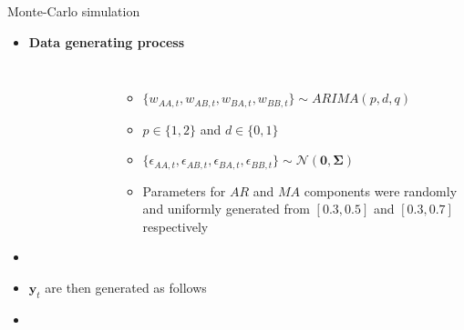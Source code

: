 \documentclass[11pt,xcolor=dvipsnames,table]{beamer} %
\begin{document}
\begin{frame}[noframenumbering]{Monte-Carlo simulation}
\begin{itemize}[<+-| alert@+>]
	\item \textbf{Data generating process}\hypertarget{Simulation}{}
	\begin{columns}
		\centering
		\begin{figure}
			\begin{center}
				  
				 
				\qobitree
			\end{center}
		\end{figure}
		
		\begin{itemize}[<+-| alert@+>]
			\item $\{w_{AA,t},w_{AB,t},w_{BA,t},w_{BB,t}\} \sim ARIMA(p,d,q)$ 	
			\item	$p \in \{1,2\}$ and $d \in \{0,1\}$
			\item $\{\epsilon_{AA,t},\epsilon_{AB,t},\epsilon_{BA,t},\epsilon_{BB,t}\} \sim \mathcal{N}(\bm{0}, \bm{\Sigma})$
			\item Parameters for $AR$ and $MA$ components were randomly and uniformly generated from $[0.3,0.5]$ and $[0.3,0.7]$ respectively
			
		\end{itemize}	
	\end{columns} 
	
	\item[]
	\item $\bm{y}_t$ are then generated as follows
	\item[]\begin{table}
		\small
		\centering %
	\end{table}
	
	
\end{itemize} 
\end{frame}
%
\end{document}
